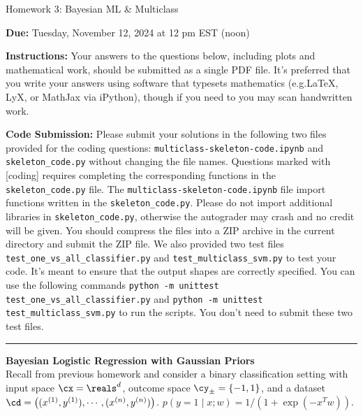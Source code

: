 \documentclass{article}
\newcommand{\nyuparagraph}[1]{\vspace{0.3cm}\textcolor{nyupurple}{\bf \large #1}\\}
\newcommand{\ruleskip}{\bigskip\hrule\bigskip}
\theoremstyle{plain}
\theoremstyle{definition}
\begin{document}

\pagestyle{myheadings} 

\begin{center}
{\Large
Homework 3: Bayesian ML \& Multiclass
} 
\end{center}

{
{ \color{nyupurple} \textbf{Due:} Tuesday, November 12, 2024  at 12 pm EST (noon)} 
} 

\textbf{Instructions: }Your answers to the questions below, including plots and mathematical
 work, should be submitted as a single PDF file.  It's preferred that you write your answers using software that typesets mathematics (e.g.LaTeX, LyX, or MathJax via iPython), though if you need to you may scan handwritten work. 


 \textbf{Code Submission: }Please submit your solutions in the following two files provided for the coding questions: \texttt{multiclass-skeleton-code.ipynb} and \texttt{skeleton\_code.py} without changing the file names. Questions marked with [coding] requires completing the corresponding functions in the \texttt{skeleton\_code.py} file. The \texttt{multiclass-skeleton-code.ipynb} file import functions written in the \texttt{skeleton\_code.py}. Please do not import additional libraries in \texttt{skeleton\_code.py}, otherwise the autograder may crash and no credit will be given. You should compress the files into a ZIP archive in the current directory and submit the ZIP file. We also provided two test files \texttt{test\_one\_vs\_all\_classifier.py} and \texttt{test\_multiclass\_svm.py} to test your code. It's meant to ensure that the output shapes are correctly specified. You can use the following commands \texttt{python -m unittest test\_one\_vs\_all\_classifier.py} and \texttt{python -m unittest test\_multiclass\_svm.py} to run the scripts. You don't need to submit these two test files. 
 
\ruleskip

\nyuparagraph{Bayesian Logistic Regression with Gaussian Priors}
Recall from previous homework and consider a binary classification setting with input
space $\cx=\reals^{d}$, outcome space $\cy_{\pm}=\left\{ -1,1\right\} $,
and a dataset $\cd=\left((x^{(1)},y^{(1)}),\cdots,(x^{(n)},y^{(n)})\right)$. 
$p(y=1 \mid x; w) = 1 / (1 + \exp(-x^Tw))$.
\end{document}
